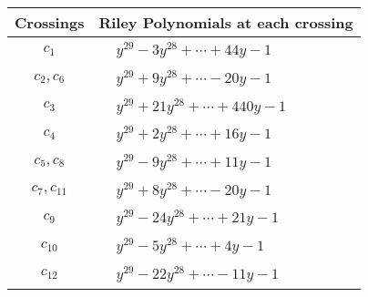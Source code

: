 \documentclass[1p]{elsarticle_modified}
\theoremstyle{definition}
\begin{document}
\begin{tabular}{m{50pt}|m{274pt}}
Crossings & \hspace{64pt}Riley Polynomials at each crossing \\
\hline $$\begin{aligned}c_{1}\end{aligned}$$&$\begin{aligned}
&y^{29}-3 y^{28}+\cdots+44 y-1
\end{aligned}$\\
\hline $$\begin{aligned}c_{2},c_{6}\end{aligned}$$&$\begin{aligned}
&y^{29}+9 y^{28}+\cdots-20 y-1
\end{aligned}$\\
\hline $$\begin{aligned}c_{3}\end{aligned}$$&$\begin{aligned}
&y^{29}+21 y^{28}+\cdots+440 y-1
\end{aligned}$\\
\hline $$\begin{aligned}c_{4}\end{aligned}$$&$\begin{aligned}
&y^{29}+2 y^{28}+\cdots+16 y-1
\end{aligned}$\\
\hline $$\begin{aligned}c_{5},c_{8}\end{aligned}$$&$\begin{aligned}
&y^{29}-9 y^{28}+\cdots+11 y-1
\end{aligned}$\\
\hline $$\begin{aligned}c_{7},c_{11}\end{aligned}$$&$\begin{aligned}
&y^{29}+8 y^{28}+\cdots-20 y-1
\end{aligned}$\\
\hline $$\begin{aligned}c_{9}\end{aligned}$$&$\begin{aligned}
&y^{29}-24 y^{28}+\cdots+21 y-1
\end{aligned}$\\
\hline $$\begin{aligned}c_{10}\end{aligned}$$&$\begin{aligned}
&y^{29}-5 y^{28}+\cdots+4 y-1
\end{aligned}$\\
\hline $$\begin{aligned}c_{12}\end{aligned}$$&$\begin{aligned}
&y^{29}-22 y^{28}+\cdots-11 y-1
\end{aligned}$\\
\hline
\end{tabular}\\~\\
\end{document}
